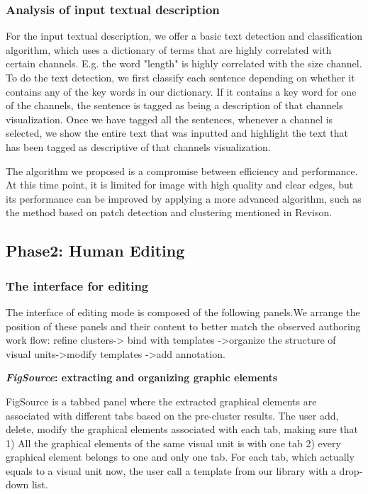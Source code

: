 \subsubsection{Analysis of input textual description}
For the input textual description, we offer a basic text detection and classification algorithm, which uses a dictionary of terms that are highly correlated with certain channels. E.g. the word "length" is highly correlated with the size channel. To do the text detection, we first classify each sentence depending on whether it contains any of the key words in our dictionary. If it contains a key word for one of the channels, the sentence is tagged as being a description of that channels visualization. Once we have tagged all the sentences, whenever a channel is selected, we show the entire text that was inputted and highlight the text that has been tagged as descriptive of that channels visualization.

The algorithm we proposed is a compromise between efficiency and performance. At this time point, it is limited for image with high quality and clear edges, but its performance can be improved by applying a more advanced algorithm, such as the method based on patch detection and clustering mentioned in Revison\cite{savva_revision:_2011}.

\subsection{Phase2: Human Editing}
\subsubsection{The interface for editing}
The interface of editing mode is composed of the following panels.We arrange the position of these panels and their content to better match the observed authoring work flow: refine clusters-> bind with templates ->organize the structure of visual units->modify templates ->add annotation. 

\textbf{\textit{FigSource}: extracting and organizing graphic elements}\par
FigSource is a tabbed panel where the extracted graphical elements are associated with different tabs based on the pre-cluster results. The user add, delete, modify the graphical elements associated with each tab, making sure that 1) All the graphical elements of the same visual unit is with one tab 2) every graphical element belongs to one and only one tab. For each tab, which actually equals to a visual unit now, the user call a template from our library with a drop-down list. 

